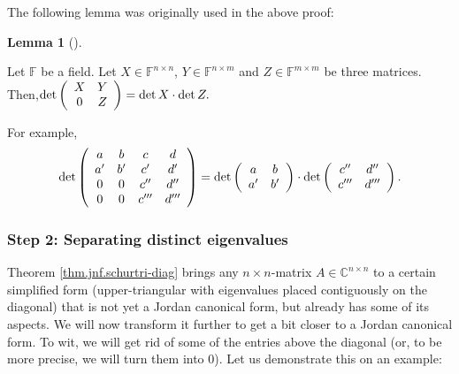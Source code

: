 \documentclass[numbers=enddot,12pt,final,onecolumn,notitlepage]{scrartcl}%
\numberwithin{exer}{subsection}
\theoremstyle{definition}
\newtheorem{lem}[theo]{Lemma}
\newenvironment{lemma}[1][]
{\begin{lem}[#1]\begin{leftbar}}
{\end{leftbar}\end{lem}}
\newenvironment{noncompile}{}{}
\begin{document}
\begin{noncompile}
The following lemma was originally used in the above proof:

\begin{lemma}
Let $\mathbb{F}$ be a field. Let $X\in\mathbb{F}^{n\times n}$, $Y\in
\mathbb{F}^{n\times m}$ and $Z\in\mathbb{F}^{m\times m}$ be three matrices.
Then,$\det\left(
\begin{array}
[c]{cc}%
X & Y\\
0 & Z
\end{array}
\right)  =\det X\cdot\det Z.$
\end{lemma}

For example,%
\[
\det\left(
\begin{array}
[c]{cccc}%
a & b & c & d\\
a^{\prime} & b^{\prime} & c^{\prime} & d^{\prime}\\
0 & 0 & c^{\prime\prime} & d^{\prime\prime}\\
0 & 0 & c^{\prime\prime\prime} & d^{\prime\prime\prime}%
\end{array}
\right)  =\det\left(
\begin{array}
[c]{cc}%
a & b\\
a^{\prime} & b^{\prime}%
\end{array}
\right)  \cdot\det\left(
\begin{array}
[c]{cc}%
c^{\prime\prime} & d^{\prime\prime}\\
c^{\prime\prime\prime} & d^{\prime\prime\prime}%
\end{array}
\right)  .
\]

\end{noncompile}

\subsubsection{Step 2: Separating distinct eigenvalues}

Theorem \ref{thm.jnf.schurtri-diag} brings any $n\times n$-matrix
$A\in\mathbb{C}^{n\times n}$ to a certain simplified form (upper-triangular
with eigenvalues placed contiguously on the diagonal) that is not yet a Jordan
canonical form, but already has some of its aspects. We will now transform it
further to get a bit closer to a Jordan canonical form. To wit, we will get
rid of some of the entries above the diagonal (or, to be more precise, we will
turn them into $0$). Let us demonstrate this on an example:
\end{document}
